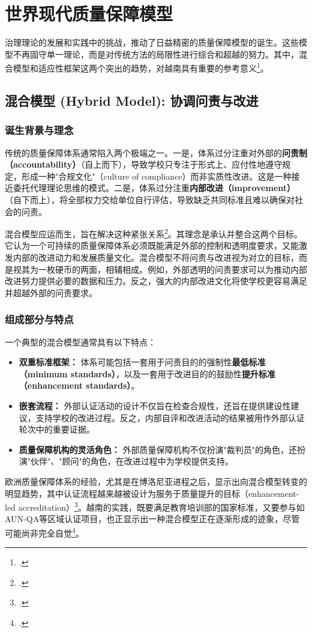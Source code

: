 \section{世界现代质量保障模型}
\label{sec:mo_hinh_hien_dai_the_gioi}

治理理论的发展和实践中的挑战，推动了日益精密的质量保障模型的诞生。这些模型不再固守单一理论，而是对传统方法的局限性进行综合和超越的努力。其中，混合模型和适应性框架这两个突出的趋势，对越南具有重要的参考意义\footcite{HybridModel2023}。

\subsection{混合模型 (Hybrid Model): 协调问责与改进}

\subsubsection{诞生背景与理念}
传统的质量保障体系通常陷入两个极端之一。一是，体系过分注重对外部的\textbf{问责制（accountability）}（自上而下），导致学校只专注于形式上、应付性地遵守规定，形成一种"合规文化"（culture of compliance）而非实质性改进。这是一种接近委托代理理论思维的模式。二是，体系过分注重\textbf{内部改进（improvement）}（自下而上），将全部权力交给单位自行评估，导致缺乏共同标准且难以确保对社会的问责。

混合模型应运而生，旨在解决这种紧张关系\footcite{EUA_Integration}。其理念是承认并整合这两个目标。它认为一个可持续的质量保障体系必须既能满足外部的控制和透明度要求，又能激发内部的改进动力和发展质量文化。混合模型不将问责与改进视为对立的目标，而是视其为一枚硬币的两面，相辅相成。例如，外部透明的问责要求可以为推动内部改进努力提供必要的数据和压力。反之，强大的内部改进文化将使学校更容易满足并超越外部的问责要求。

\subsubsection{组成部分与特点}
一个典型的混合模型通常具有以下特点：
\begin{itemize}
    \item \textbf{双重标准框架：} 体系可能包括一套用于问责目的的强制性\textbf{最低标准（minimum standards）}，以及一套用于改进目的的鼓励性\textbf{提升标准（enhancement standards）}。
    \item \textbf{嵌套流程：} 外部认证活动的设计不仅旨在检查合规性，还旨在提供建设性建议，支持学校的改进过程。反之，内部自评和改进活动的结果被用作外部认证轮次中的重要证据。
    \item \textbf{质量保障机构的灵活角色：} 外部质量保障机构不仅扮演"裁判员"的角色，还扮演"伙伴"、"顾问"的角色，在改进过程中为学校提供支持。
\end{itemize}
欧洲质量保障体系的经验，尤其是在博洛尼亚进程之后，显示出向混合模型转变的明显趋势，其中认证流程越来越被设计为服务于质量提升的目标（enhancement-led accreditation）\footcite{EUA_Integration}。越南的实践，既要满足教育培训部的国家标准，又要参与如AUN-QA等区域认证项目，也正显示出一种混合模型正在逐渐形成的迹象，尽管可能尚非完全自觉\footcite{VNUCEA2023}。

